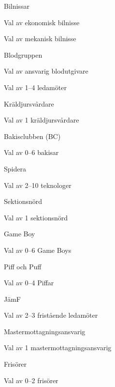 \documentclass{sektionsmote}
\begin{document}
\begin{ootd}
\begin{ootd}
    \item Bilnissar
    \begin{ootd}
        \item Val av ekonomisk bilnisse
        \item Val av mekanisk bilnisse
    \end{ootd}
    \item Blodgruppen
    \begin{ootd}
        \item Val av ansvarig blodutgivare
        \item Val av 1--4 ledamöter
    \end{ootd}
    \item Kräldjursvårdare
    \begin{ootd}
        \item Val av 1 kräldjursvårdare
    \end{ootd}
    \item Bakisclubben (BC)
    \begin{ootd}
        \item Val av 0--6 bakisar
    \end{ootd}
    \item Spidera
    \begin{ootd}
        \item Val av 2--10 teknologer
    \end{ootd}
    \item Sektionsnörd
    \begin{ootd}
        \item Val av 1 sektionsnörd
    \end{ootd}
    \item Game Boy
    \begin{ootd}
        \item Val av 0--6 Game Boys
    \end{ootd}
    \item Piff och Puff
    \begin{ootd}
        \item Val av 0--4 Piffar
    \end{ootd}
    \item JämF
    \begin{ootd}
        \item Val av 2--3 fristående ledamöter
    \end{ootd}
    \item Mastermottagningsansvarig
    \begin{ootd}
        \item Val av 1 mastermottagningsansvarig
    \end{ootd}
    \item Frisörer
    \begin{ootd}
        \item Val av 0--2 frisörer
    \end{ootd}
\end{ootd}


\end{ootd}
\end{document}
